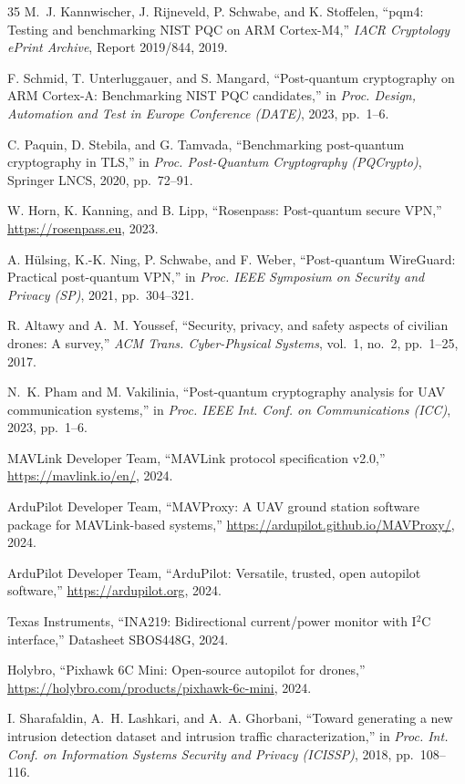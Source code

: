 \documentclass[conference]{IEEEtran}
\begin{document}
\begin{thebibliography}{35}
M.~J. Kannwischer, J. Rijneveld, P. Schwabe, and K. Stoffelen, ``pqm4: Testing and benchmarking NIST PQC on ARM Cortex-M4,'' \emph{IACR Cryptology ePrint Archive}, Report 2019/844, 2019.

F. Schmid, T. Unterluggauer, and S. Mangard, ``Post-quantum cryptography on ARM Cortex-A: Benchmarking NIST PQC candidates,'' in \emph{Proc. Design, Automation and Test in Europe Conference (DATE)}, 2023, pp.~1--6.

C. Paquin, D. Stebila, and G. Tamvada, ``Benchmarking post-quantum cryptography in TLS,'' in \emph{Proc. Post-Quantum Cryptography (PQCrypto)}, Springer LNCS, 2020, pp.~72--91.

W. Horn, K. Kanning, and B. Lipp, ``Rosenpass: Post-quantum secure VPN,'' \url{https://rosenpass.eu}, 2023.

A. H{\"u}lsing, K.-K. Ning, P. Schwabe, and F. Weber, ``Post-quantum WireGuard: Practical post-quantum VPN,'' in \emph{Proc. IEEE Symposium on Security and Privacy (SP)}, 2021, pp.~304--321.

R. Altawy and A.~M. Youssef, ``Security, privacy, and safety aspects of civilian drones: A survey,'' \emph{ACM Trans. Cyber-Physical Systems}, vol.~1, no.~2, pp.~1--25, 2017.

N.~K. Pham and M. Vakilinia, ``Post-quantum cryptography analysis for UAV communication systems,'' in \emph{Proc. IEEE Int. Conf. on Communications (ICC)}, 2023, pp.~1--6.

MAVLink Developer Team, ``MAVLink protocol specification v2.0,'' \url{https://mavlink.io/en/}, 2024.

ArduPilot Developer Team, ``MAVProxy: A UAV ground station software package for MAVLink-based systems,'' \url{https://ardupilot.github.io/MAVProxy/}, 2024.

ArduPilot Developer Team, ``ArduPilot: Versatile, trusted, open autopilot software,'' \url{https://ardupilot.org}, 2024.

Texas Instruments, ``INA219: Bidirectional current/power monitor with I$^2$C interface,'' Datasheet SBOS448G, 2024.

Holybro, ``Pixhawk 6C Mini: Open-source autopilot for drones,'' \url{https://holybro.com/products/pixhawk-6c-mini}, 2024.

I. Sharafaldin, A.~H. Lashkari, and A.~A. Ghorbani, ``Toward generating a new intrusion detection dataset and intrusion traffic characterization,'' in \emph{Proc. Int. Conf. on Information Systems Security and Privacy (ICISSP)}, 2018, pp.~108--116.


\end{thebibliography}
\end{document}

